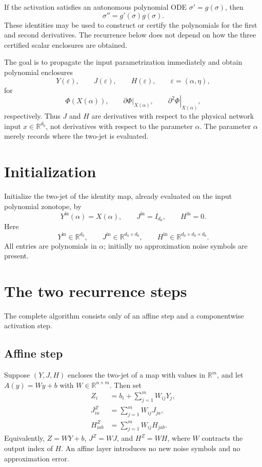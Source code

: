 \documentclass[11pt]{article}
\newcommand{\R}{\mathbb{R}}
\newcommand{\eps}{\varepsilon}
\begin{document}
If the activation satisfies an autonomous polynomial ODE
\(\sigma'=g(\sigma)\), then
\[
    \sigma''=g'(\sigma)g(\sigma).
\]
These identities may be used to construct or certify the polynomials for the
first and second derivatives.  The recurrence below does not depend on how the
three certified scalar enclosures are obtained.

The goal is to propagate the input parametrization immediately and obtain
polynomial enclosures
\[
    Y(\eps),\qquad
    J(\eps),\qquad
    H(\eps),
    \qquad \eps=(\alpha,\eta),
\]
for
\[
    \Phi(X(\alpha)),\qquad
    \left.\partial\Phi\right|_{X(\alpha)},\qquad
    \left.\partial^2\Phi\right|_{X(\alpha)},
\]
respectively.  Thus \(J\) and \(H\) are derivatives with respect to the
physical network input \(x\in\R^{d_0}\), not derivatives with respect to
the parameter \(\alpha\).  The parameter \(\alpha\) merely records where
the two-jet is evaluated.

\section{Initialization}

Initialize the two-jet of the identity map, already evaluated on the input
polynomial zonotope, by
\begin{equation}
    Y^{\mathrm{in}}(\alpha)=X(\alpha),
    \qquad
    J^{\mathrm{in}}=I_{d_0},
    \qquad
    H^{\mathrm{in}}=0.
    \label{eq:initialization}
\end{equation}
Here
\[
    Y^{\mathrm{in}}\in\R^{d_0},\qquad
    J^{\mathrm{in}}\in\R^{d_0\times d_0},\qquad
    H^{\mathrm{in}}\in\R^{d_0\times d_0\times d_0}.
\]
All entries are polynomials in \(\alpha\); initially no approximation noise
symbols are present.

\section{The two recurrence steps}

The complete algorithm consists only of an affine step and a componentwise
activation step.

\subsection{Affine step}

Suppose \((Y,J,H)\) encloses the two-jet of a map with values in \(\R^m\),
and let \(A(y)=Wy+b\) with \(W\in\R^{n\times m}\).  Then set
\begin{equation}
    \boxed{
    \begin{aligned}
        Z_i      &= b_i+\sum_{j=1}^m W_{ij}Y_j,\\
        J^Z_{ia} &= \sum_{j=1}^m W_{ij}J_{ja},\\
        H^Z_{iab}&= \sum_{j=1}^m W_{ij}H_{jab}.
    \end{aligned}}
    \label{eq:affine-recurrence}
\end{equation}
Equivalently, \(Z=WY+b\), \(J^Z=WJ\), and \(H^Z=WH\), where \(W\)
contracts the output index of \(H\).  An affine layer introduces no new
noise symbols and no approximation error.
\end{document}
